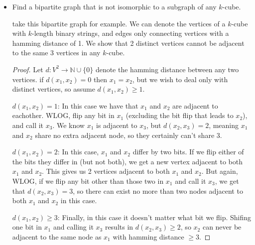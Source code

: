 \documentclass[11pt]{article}
\newcommand\itm[1]{\item[\textbf{#1}]}
\newcommand{\n}{\vspace{0.5cm}}
\begin{document}
\begin{itemize}
  \itm{1.4.4} Find a bipartite graph that is not isomorphic to a subgraph of any \(k\)-cube.

    \begin{center}
    \end{center}

    take this bipartite graph for example.  We can denote the vertices of a \(k\)-cube with \(k\)-length binary strings, and edges only connecting vertices with a hamming distance of 1.  We show that 2 distinct vertices cannot be adjacent to the same 3 vertices in any \(k\)-cube.
      \begin{proof}
        Let \(d \colon V^2 \to \mathbb{N} \cup \{0\}\) denote the hamming distance between any two vertices.  if \(d(x_1,x_2) = 0\) then \(x_1 = x_2\), but we wish to deal only with distinct vertices, so assume \(d(x_1,x_2) \geq 1\). \n

        \(d(x_1, x_2) = 1\): In this case we have that \(x_1\) and \(x_2\) are adjacent to eachother.  WLOG, flip any bit in \(x_1\) (excluding the bit flip that leads to \(x_2\)), and call it \(x_3\).  We know \(x_1\) is adjacent to \(x_3\), but \(d(x_2,x_3) = 2\), meaning \(x_1\) and \(x_2\) share no extra adjacent node, so they certainly can't share 3. \n

        \(d(x_1,x_2) = 2\): In this case, \(x_1\) and \(x_2\) differ by two bits.  If we flip either of the bits they differ in (but not both), we get a new vertex adjacent to both \(x_1\) and \(x_2\).  This gives us 2 vertices adjacent to both \(x_1\) and \(x_2\).  But again, WLOG, if we flip any bit other than those two in \(x_1\) and call it \(x_3\), we get that \(d(x_2,x_3) = 3\), so there can exist no more than two nodes adjacent to both \(x_1\) and \(x_2\) in this case. \n

        \(d(x_1,x_2) \geq 3\): Finally, in this case it doesn't matter what bit we flip.  Shifing one bit in \(x_1\) and calling it \(x_3\) results in \(d(x_2,x_3) \geq 2\), so \(x_2\) can never be adjacent to the same node as \(x_1\) with hamming distance \(\geq 3\). \n


\end{proof}
\end{itemize}
\end{document}
